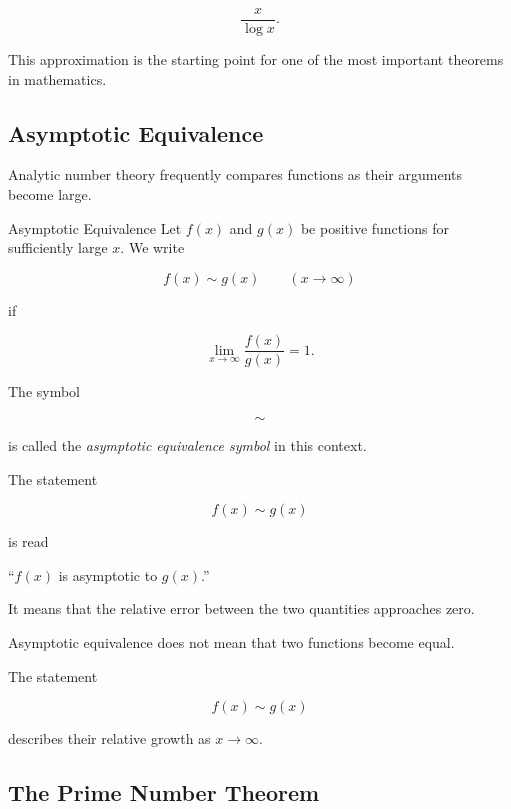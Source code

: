 \[ \frac{x}{\log x}. \]

This approximation is the starting point for one of the most important
theorems in mathematics.

\subsection{Asymptotic Equivalence}
\label{subsec:asymptotic-equivalence-number-theory}

Analytic number theory frequently compares functions as their arguments
become large.

\begin{definitionbox}{Asymptotic Equivalence}
Let \(f(x)\) and \(g(x)\) be positive functions for sufficiently large \(x\).
We write

\[ f(x)\sim g(x)\qquad(x\to\infty) \]

if

\[ \lim_{x\to\infty}\frac{f(x)}{g(x)}=1. \]
\end{definitionbox}

The symbol

\[ \sim \]

is called the \emph{asymptotic equivalence symbol} in this context.

The statement

\[ f(x)\sim g(x) \]

is read

\begin{center}
``\(f(x)\) is asymptotic to \(g(x)\).''
\end{center}

It means that the relative error between the two quantities approaches zero.

\begin{warningbox}
Asymptotic equivalence does not mean that two functions become equal.

The statement

\[ f(x)\sim g(x) \]

describes their relative growth as \(x\to\infty\).
\end{warningbox}

\subsection{The Prime Number Theorem}
\label{subsec:prime-number-theorem}

